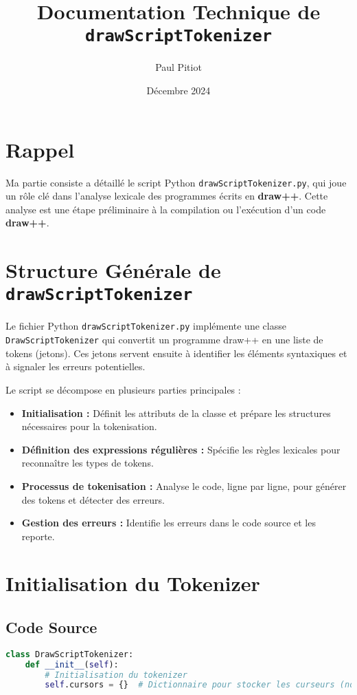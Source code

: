 \documentclass[12pt]{article}
\title{Documentation Technique de \texttt{drawScriptTokenizer}}
\author{Paul Pitiot}
\date{Décembre 2024}
\begin{document}
\maketitle

\section*{Rappel}
Ma partie consiste a détaillé le script Python \texttt{drawScriptTokenizer.py}, qui joue un rôle clé dans l'analyse lexicale des programmes écrits en \textbf{draw++}. Cette analyse est une étape préliminaire à la compilation ou l'exécution d'un code \textbf{draw++}.

\section{Structure Générale de \texttt{drawScriptTokenizer}}
Le fichier Python \texttt{drawScriptTokenizer.py} implémente une classe \texttt{DrawScriptTokenizer} qui convertit un programme draw++ en une liste de tokens (jetons). Ces jetons servent ensuite à identifier les éléments syntaxiques et à signaler les erreurs potentielles.

Le script se décompose en plusieurs parties principales :
\begin{itemize}
    \item \textbf{Initialisation :} Définit les attributs de la classe et prépare les structures nécessaires pour la tokenisation.
    \item \textbf{Définition des expressions régulières :} Spécifie les règles lexicales pour reconnaître les types de tokens.
    \item \textbf{Processus de tokenisation :} Analyse le code, ligne par ligne, pour générer des tokens et détecter des erreurs.
    \item \textbf{Gestion des erreurs :} Identifie les erreurs dans le code source et les reporte.
\end{itemize}

\section{Initialisation du Tokenizer}
\subsection*{Code Source}
\begin{lstlisting}[language=Python, caption={Initialisation de \texttt{DrawScriptTokenizer}}]
class DrawScriptTokenizer:
    def __init__(self):
        # Initialisation du tokenizer
        self.cursors = {}  # Dictionnaire pour stocker les curseurs (non utilisé dans ce code)
\end{lstlisting}
\end{document}
